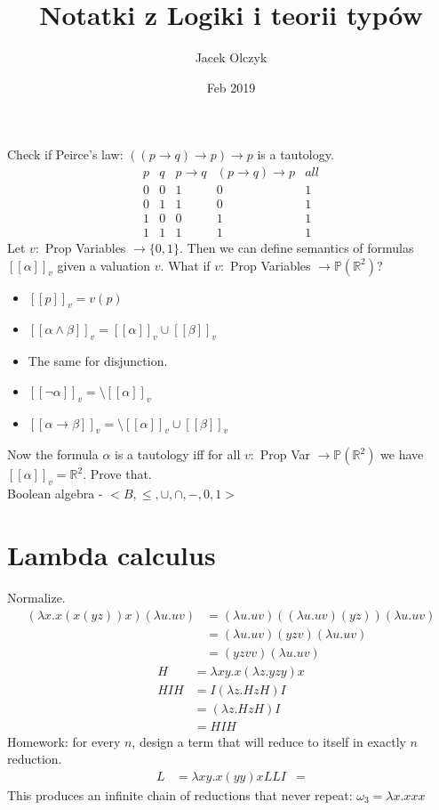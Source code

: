 \documentclass{article}
\title{Notatki z Logiki i teorii typów}
\author{Jacek Olczyk}
\date{Feb 2019}
\begin{document}
\maketitle

Check if Peirce's law: $((p \rightarrow q) \rightarrow p) \rightarrow p$ is a tautology.
$$\begin{array}{c|c|c|c|c}
p&q&p \rightarrow q&(p \rightarrow q) \rightarrow p&all\\
\hline
0&0&1&0&1\\
0&1&1&0&1\\
1&0&0&1&1\\
1&1&1&1&1
\end{array}$$
Let $ v: $ Prop Variables $ \rightarrow \{0,1\}$. Then we can define semantics of formulas $ [[\alpha]]_v $ given a valuation $ v $. What if $ v: $ Prop Variables $ \rightarrow \mathbb{P}(\mathbb{R}^2)$?
\begin{itemize}
	\item $ [[p]]_v=v(p) $
	\item $ [[\alpha\wedge\beta]]_v=[[\alpha]]_v\cup[[\beta]]_v $
	\item The same for disjunction.
	\item $ [[\neg\alpha]]_v=\setminus[[\alpha]]_v $
	\item $ [[\alpha \rightarrow \beta]]_v=\setminus[[\alpha]]_v\cup[[\beta]]_v $
\end{itemize}
Now the formula $ \alpha $ is a tautology iff for all $ v: $ Prop Var $  \rightarrow \mathbb{P}(\mathbb{R}^2) $ we have $ [[\alpha]]_v=\mathbb{R}^2 $. Prove that.\\
Boolean algebra - $ <B, \le, \cup, \cap, -, 0, 1> $\\
\section{Lambda calculus}
Normalize.
\begin{align*}
(\lambda x.x(x(y z))x)(\lambda u.uv) &= (\lambda u.uv)((\lambda u.uv)(yz))(\lambda u.uv)\\
&=(\lambda u.uv)(yzv)(\lambda u.uv)\\
&=(yzvv)(\lambda u.uv)
\end{align*}
\begin{align*}
H&=\lambda xy.x(\lambda z.yzy)x\\
HIH &= I (\lambda z. HzH)I\\
&=(\lambda z. HzH)I\\
&=HIH
\end{align*}
Homework: for every $n$, design a term that will reduce to itself in exactly $ n $ reduction.
\begin{align*}
L&=\lambda xy.x(yy)x
LLI&=
\end{align*}
This produces an infinite chain of reductions that never repeat:
$ \omega_3 =\lambda x.xxx$
\end{document}

